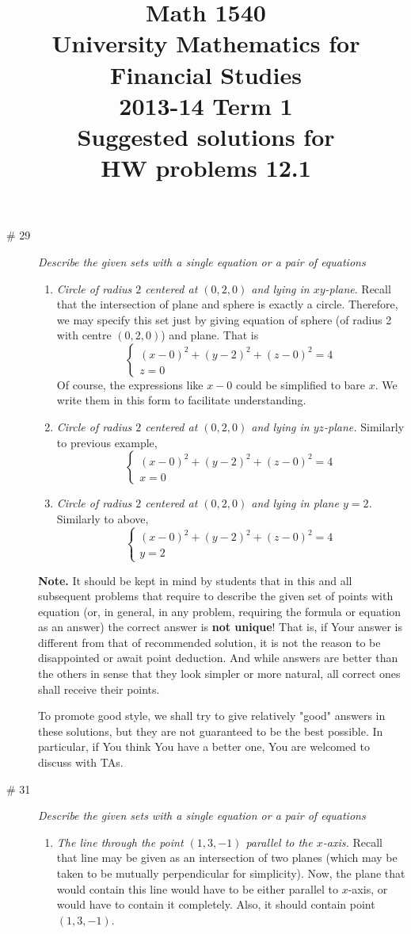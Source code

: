 \documentclass[8pt]{article} %
\title{Math 1540\\University Mathematics for Financial Studies\\2013-14 Term 1\\Suggested solutions for\\HW problems 12.1}
\begin{document}
\maketitle
\begin{description}
\item[\# 29]{{\it Describe the given sets with a single equation or a pair of equations}
\begin{enumerate}[label=\bfseries\alph*.]
\item{{\it Circle of radius $2$ centered at $(0,2,0)$ and lying in $xy$-plane}. Recall that the intersection of plane and sphere is exactly a circle.
Therefore, we may specify this set just by giving equation of sphere (of radius 2 with centre $(0,2,0)$) and plane. That is
\[
\begin{cases}
(x-0)^2+(y-2)^2+(z-0)^2=4\\z=0
\end{cases}
\]
Of course, the expressions like $x-0$ could be simplified to bare $x$. We write them in this form to facilitate understanding.
}
\item{{\it Circle of radius $2$ centered at $(0,2,0)$ and lying in $yz$-plane.} Similarly to previous example,
\[
\begin{cases}
(x-0)^2+(y-2)^2+(z-0)^2=4\\x=0
\end{cases}
\]}
\item{{\it Circle of radius $2$ centered at $(0,2,0)$ and lying in plane $y=2$.} Similarly to above,
\[
\begin{cases}
(x-0)^2+(y-2)^2+(z-0)^2=4\\y=2
\end{cases}
\]}
\end{enumerate}
\textbf{Note. } It should be kept in mind by students that in this and all subsequent problems that require to describe the given set
of points with equation (or, in general, in any problem, requiring the formula or equation as an answer) the correct answer is \textbf{not unique}! That is, if Your answer is different from that of recommended solution, it is
not the reason to be disappointed or await point deduction. And while answers are better than the others in sense that they
look simpler or more natural, all correct ones shall receive their points.

To promote good style, we shall try to give relatively "good" answers in these solutions, but they are not guaranteed to be the best possible.
In particular, if You think You have a better one, You are welcomed to discuss with TAs.
}
\item[\# 31]{
{\it Describe the given sets with a single equation or a pair of equations}
\begin{enumerate}[label=\bfseries\alph*.]
\item{{\it The line through the point $(1,3,-1)$ parallel to the $x$-axis.} Recall that line may be given as an intersection of two planes (which
may be taken to be mutually perpendicular for simplicity). Now, the plane that would contain this line would have to be either
parallel to $x$-axis, or would have to contain it completely. Also, it should contain point $(1,3,-1)$.

}
\end{enumerate}}
\end{description}
\end{document}
